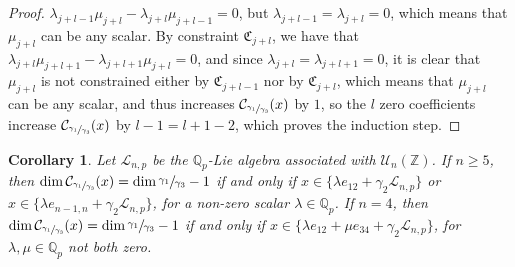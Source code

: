\documentclass[12pt]{article}
\newtheorem{corollary}[theorem]{Corollary}
\begin{document}
\begin{proof}
$\lambda_{j+l-1}\mu_{j+l}-\lambda_{j+l}\mu_{j+l-1}=0$, but $\lambda_{j+l-1}=\lambda_{j+l}=0$, which means that $\mu_{j+l}$ can be any scalar. By constraint $\mathfrak{C}_{j+l}$, we have that $\lambda_{j+l}\mu_{j+l+1}-\lambda_{j+l+1}\mu_{j+l}=0$, and since $\lambda_{j+l}=\lambda_{j+l+1}=0$, it is clear that $\mu_{j+l}$ is not constrained either by $\mathfrak{C}_{j+l-1}$ nor by $\mathfrak{C}_{j+l}$, which means that $\mu_{j+l}$ can be any scalar, and thus increases $\mathcal{C}_{\sfrac{\gamma_1}{\gamma_3}}(x)$ by $1$, so the $l$ zero coefficients increase $\mathcal{C}_{\sfrac{\gamma_1}{\gamma_3}}(x)$ by $l-1=l+1-2$, which proves the induction step.
\end{proof}
\begin{corollary}
\label{prop.n.geq.4.centralizer.codimension}
Let $\mathcal{L}_{n,p}$ be the $\mathbb{Q}_p$-Lie algebra associated with $\mathcal{U}_n(\mathbb{Z})$. If $n\geq 5$, then $\dim\mathcal{C}_{\sfrac{\gamma_1}{\gamma_3}}(x)=\dim\sfrac{\gamma_1}{\gamma_3}-1$ if and only if $x\in\{\lambda e_{12}+\gamma_2\mathcal{L}_{n,p}\}$ or $x\in\{\lambda e_{n-1,n}+\gamma_2\mathcal{L}_{n,p}\}$, for a non-zero scalar $\lambda\in\mathbb{Q}_p$. If $n=4$, then $\dim\mathcal{C}_{\sfrac{\gamma_1}{\gamma_3}}(x)=\dim\sfrac{\gamma_1}{\gamma_3}-1$ if and only if $x\in\{\lambda e_{12}+\mu e_{34}+\gamma_2\mathcal{L}_{n,p}\}$, for $\lambda,\mu\in\mathbb{Q}_p$ not both zero.
\end{corollary}
\end{document}
